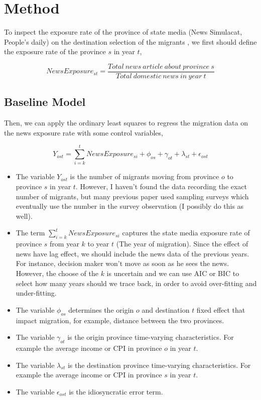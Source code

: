 \documentclass{article}
\begin{document}
\section{Method}
To inspect the exposure rate of the province of state media (News Simulacat, People's daily) on the destination selection of the migrants , we first should define the exposure rate of the province $s$ in year $t$,

\begin{equation}
    NewsExposure_{st}=\frac{Total\ news\ article\ about\ province\ s}{Total\ domestic\ news\ in\ year\ t}
\end{equation}

\subsection{Baseline Model}
Then, we can apply the ordinary least squares to regress the migration data on the news exposure rate  with some control variables,

\begin{equation}
    Y_{ost}=\sum_{i=k}^{t}NewsExposure_{si}+ \phi_{os}+ \gamma_{ot}+ \lambda_{st}+ \epsilon_{ost}
\end{equation}
\begin{itemize}
  \item The variable $Y_{ost}$ is the number of migrants moving from province $o$ to province $s$ in year $t$. However, I haven't found the data recording the exact number of migrants, but many previous paper used sampling surveys which eventually use the number in the survey observation (I possibly do this as well).

  \item The term $\sum_{i=k}^{t}NewsExposure_{si}$ captures the state media exposure rate of province $s$ from year $k$ to year $t$ (The year of migration). Since the effect of news have lag effect, we should include the news data of the previous years. For instance, decision maker won't move as soon as he sees the news. However, the choose of the $k$ is uncertain and we can use AIC or BIC to select how many years should we trace back, in order to avoid over-fitting and under-fitting.

  \item The variable $\phi_{os}$ determines the origin $o$ and destination $t$ fixed effect that impact migration, for example, distance between the two provinces. 

  \item The variable $\gamma_{ot}$ is the origin province time-varying characteristics. For example the average income or CPI in province $o$ in year $t$.

  \item The variable $\lambda_{st}$ is the destination province time-varying characteristics. For example the average income or CPI in province $s$ in year $t$.

  \item The variable $\epsilon_{ost}$ is the idiosyncratic error term.
\end{itemize}
\\~\\
\end{document}
